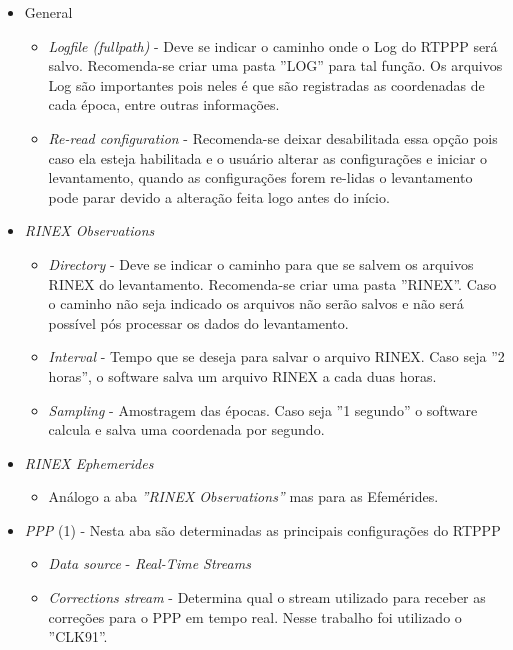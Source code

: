 \begin{itemize}
    \item General
    \begin{itemize}
        \item \textit{Logfile (fullpath)} - Deve se indicar o caminho onde o Log do RTPPP será salvo. Recomenda-se criar uma pasta ''LOG'' para tal função. Os arquivos Log são importantes pois neles é que são registradas as coordenadas de cada época, entre outras informações.
        \item \textit{Re-read configuration} - Recomenda-se deixar desabilitada essa opção pois caso ela esteja habilitada e o usuário alterar as configurações e iniciar o levantamento, quando as configurações forem re-lidas o levantamento pode parar devido a alteração feita logo antes do início.
    \end{itemize}
    \item \textit{RINEX Observations}
    \begin{itemize}
        \item \textit{Directory} - Deve se indicar o caminho para que se salvem os arquivos RINEX do levantamento. Recomenda-se criar uma pasta ''RINEX''. Caso o caminho não seja indicado os arquivos não serão salvos e não será possível pós processar os dados do levantamento.
        \item \textit{Interval} - Tempo que se deseja para salvar o arquivo RINEX. Caso seja ''2 horas'', o software salva um arquivo RINEX a cada duas horas.
        \item \textit{Sampling} - Amostragem das épocas. Caso seja ''1 segundo'' o software calcula e salva uma coordenada por segundo.
    \end{itemize}
    \item \textit{RINEX Ephemerides}
    \begin{itemize}
        \item Análogo a aba \textit{''RINEX Observations''} mas para as Efemérides.
    \end{itemize}
    \item \textit{PPP} (1) - Nesta aba são determinadas as principais configurações do RTPPP
    \begin{itemize}
        \item \textit{Data source} - \textit{Real-Time Streams}
        \item \textit{Corrections stream} - Determina qual o stream utilizado para receber as correções para o PPP em tempo real. Nesse trabalho foi utilizado o ''CLK91''.

\end{itemize}
\end{itemize}

